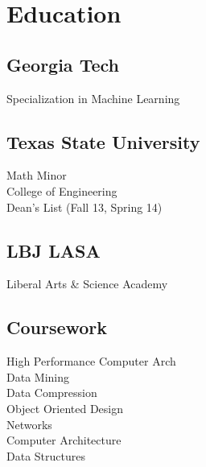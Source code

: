 \documentclass[letterpaper]{resume} %
\begin{document}
\begin{minipage}[t]{0.33\textwidth} %


\section{Education} 

\subsection{Georgia Tech}
Specialization in Machine Learning

\sectionspace

\subsection{Texas State University}
Math Minor \\
College of Engineering \\
Dean's List (Fall 13, Spring 14) \\

\sectionspace %


\subsection{LBJ LASA}
Liberal Arts \& Science Academy \\

\sectionspace %


\subsection{Coursework}

High Performance Computer Arch \\
Data Mining \\
Data Compression \\
Object Oriented Design \\
Networks \\
Computer Architecture \\
Data Structures


\end{minipage}
\end{document}
